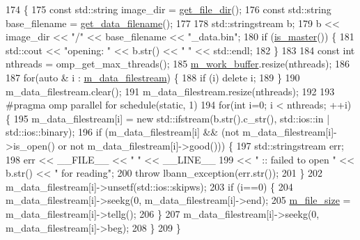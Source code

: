 \begin{DoxyCode}
174                                               \{
175   \textcolor{keyword}{const} std::string image\_dir = \hyperlink{classlbann_1_1generic__data__reader_ab4c6c2d4ba40ece809ce896828c8ff03}{get\_file\_dir}();
176   \textcolor{keyword}{const} std::string base\_filename = \hyperlink{classlbann_1_1generic__data__reader_a56664e1b43f3fe923cf6d652f14b40a9}{get\_data\_filename}();
177 
178   std::stringstream b;
179   b << image\_dir << \textcolor{stringliteral}{"/"} << base\_filename << \textcolor{stringliteral}{"\_data.bin"};
180   \textcolor{keywordflow}{if} (\hyperlink{classlbann_1_1generic__data__reader_ae82c40eebc05e2f0c1198afcc7a7f009}{is\_master}()) \{
181     std::cout << \textcolor{stringliteral}{"opening: "} << b.str() << \textcolor{stringliteral}{" "} << std::endl;
182   \}
183 
184   \textcolor{keyword}{const} \textcolor{keywordtype}{int} nthreads = omp\_get\_max\_threads();
185   \hyperlink{classlbann_1_1imagenet__reader__single_a499b197f1d985b592801de9adfe2d2f5}{m\_work\_buffer}.resize(nthreads);
186 
187   \textcolor{keywordflow}{for}(\textcolor{keyword}{auto} & i : \hyperlink{classlbann_1_1imagenet__reader__single_af617e1b0b019049682db6de6e01b05ca}{m\_data\_filestream}) \{
188     \textcolor{keywordflow}{if} (i) \textcolor{keyword}{delete} i;
189   \}
190   m\_data\_filestream.clear();
191   m\_data\_filestream.resize(nthreads);
192 
193 \textcolor{preprocessor}{  #pragma omp parallel for schedule(static, 1)}
194   \textcolor{keywordflow}{for}(\textcolor{keywordtype}{int} i=0; i < nthreads; ++i) \{
195     m\_data\_filestream[i] = \textcolor{keyword}{new} std::ifstream(b.str().c\_str(), std::ios::in | std::ios::binary);
196     \textcolor{keywordflow}{if} (m\_data\_filestream[i] && (not m\_data\_filestream[i]->is\_open() or not m\_data\_filestream[i]->good())) 
      \{
197       std::stringstream err;
198       err << \_\_FILE\_\_ << \textcolor{stringliteral}{" "} << \_\_LINE\_\_
199           << \textcolor{stringliteral}{" ::  failed to open "} << b.str() << \textcolor{stringliteral}{" for reading"};
200       \textcolor{keywordflow}{throw} lbann\_exception(err.str());
201     \}
202     m\_data\_filestream[i]->unsetf(std::ios::skipws);
203     \textcolor{keywordflow}{if} (i==0) \{
204       m\_data\_filestream[i]->seekg(0, m\_data\_filestream[i]->end);
205       \hyperlink{classlbann_1_1imagenet__reader__single_aa1a20a782f97e697d9d70371a5e33384}{m\_file\_size} = m\_data\_filestream[i]->tellg();
206     \}
207     m\_data\_filestream[i]->seekg(0, m\_data\_filestream[i]->beg);
208   \}
209 \}
\end{DoxyCode}
